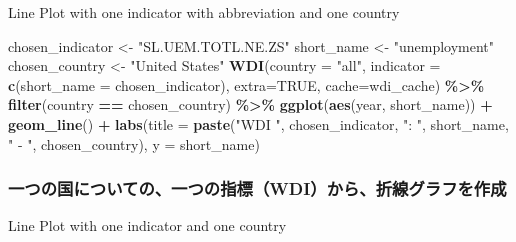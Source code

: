 \documentclass[
  xelatex, ja=standard]{bxjsbook}
\newenvironment{Shaded}{\begin{snugshade}}{\end{snugshade}}
\newcommand{\AttributeTok}[1]{\textcolor[rgb]{0.13,0.29,0.53}{#1}}
\newcommand{\ConstantTok}[1]{\textcolor[rgb]{0.56,0.35,0.01}{#1}}
\newcommand{\FunctionTok}[1]{\textcolor[rgb]{0.13,0.29,0.53}{\textbf{#1}}}
\newcommand{\NormalTok}[1]{#1}
\newcommand{\OtherTok}[1]{\textcolor[rgb]{0.56,0.35,0.01}{#1}}
\newcommand{\SpecialCharTok}[1]{\textcolor[rgb]{0.81,0.36,0.00}{\textbf{#1}}}
\newcommand{\StringTok}[1]{\textcolor[rgb]{0.31,0.60,0.02}{#1}}
\theoremstyle{definition}
\theoremstyle{definition}
\theoremstyle{definition}
\theoremstyle{definition}
\theoremstyle{remark}
\begin{document}
Line Plot with one indicator with abbreviation and one country

\begin{Shaded}
\begin{Highlighting}[]
\NormalTok{chosen\_indicator }\OtherTok{\textless{}{-}} \StringTok{"SL.UEM.TOTL.NE.ZS"}
\NormalTok{short\_name }\OtherTok{\textless{}{-}} \StringTok{"unemployment"}
\NormalTok{chosen\_country }\OtherTok{\textless{}{-}} \StringTok{"United States"}
\FunctionTok{WDI}\NormalTok{(}\AttributeTok{country =} \StringTok{"all"}\NormalTok{, }\AttributeTok{indicator =} \FunctionTok{c}\NormalTok{(}\AttributeTok{short\_name =}\NormalTok{ chosen\_indicator), }\AttributeTok{extra=}\ConstantTok{TRUE}\NormalTok{, }\AttributeTok{cache=}\NormalTok{wdi\_cache) }\SpecialCharTok{\%\textgreater{}\%}
  \FunctionTok{filter}\NormalTok{(country }\SpecialCharTok{==}\NormalTok{ chosen\_country) }\SpecialCharTok{\%\textgreater{}\%} 
  \FunctionTok{ggplot}\NormalTok{(}\FunctionTok{aes}\NormalTok{(year, short\_name)) }\SpecialCharTok{+} \FunctionTok{geom\_line}\NormalTok{() }\SpecialCharTok{+}
  \FunctionTok{labs}\NormalTok{(}\AttributeTok{title =} \FunctionTok{paste}\NormalTok{(}\StringTok{"WDI "}\NormalTok{, chosen\_indicator, }\StringTok{": "}\NormalTok{, short\_name, }\StringTok{" {-} "}\NormalTok{, chosen\_country),}
       \AttributeTok{y =}\NormalTok{ short\_name)}
\end{Highlighting}
\end{Shaded}

\hypertarget{ux4e00ux3064ux306eux56fdux306bux3064ux3044ux3066ux306eux4e00ux3064ux306eux6307ux6a19wdiux304bux3089ux6298ux7ddaux30b0ux30e9ux30d5ux3092ux4f5cux6210}{%
\subsubsection{一つの国についての、一つの指標（WDI）から、折線グラフを作成}\label{ux4e00ux3064ux306eux56fdux306bux3064ux3044ux3066ux306eux4e00ux3064ux306eux6307ux6a19wdiux304bux3089ux6298ux7ddaux30b0ux30e9ux30d5ux3092ux4f5cux6210}}

Line Plot with one indicator and one country
\end{document}
